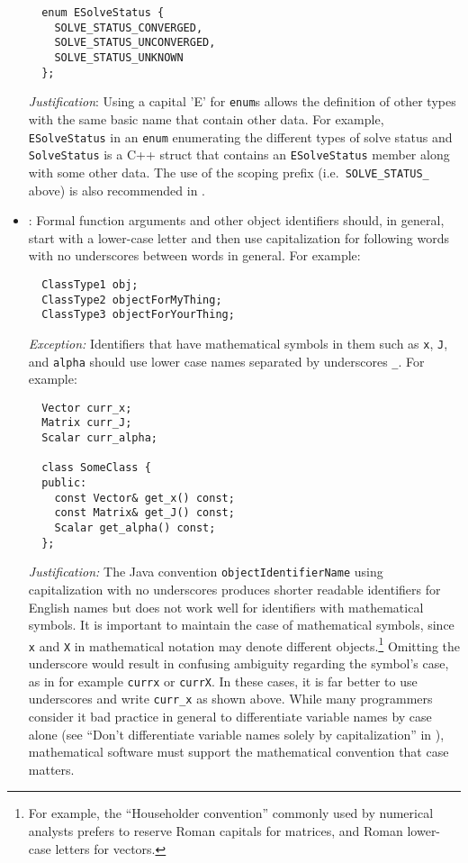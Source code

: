 \begin{itemize}
{\small\begin{verbatim}
  enum ESolveStatus {
    SOLVE_STATUS_CONVERGED,
    SOLVE_STATUS_UNCONVERGED,
    SOLVE_STATUS_UNKNOWN
  };
\end{verbatim}}


{}\textit{Justification}: Using a capital 'E' for {}\texttt{enum}s allows the
definition of other types with the same basic name that contain other data.
For example, {}\texttt{ESolveStatus} in an {}\texttt{enum} enumerating the
different types of solve status and {}\texttt{SolveStatus} is a C++ struct
that contains an {}\texttt{ESolveStatus} member along with some other data.
The use of the scoping prefix (i.e.\ {}\texttt{SOLVE\-\_STATUS\_} above) is
also recommended in {}\cite[Section 11.4]{CodeComplete2nd04}.


{}\item\NCObjectNames: Formal function arguments and other object identifiers
should, in general, start with a lower-case letter and then use capitalization
for following words with no underscores between words in general.  For
example:

{\small\begin{verbatim}
  ClassType1 obj;
  ClassType2 objectForMyThing;
  ClassType3 objectForYourThing;
\end{verbatim}}


{}\textit{Exception:} Identifiers that have mathematical symbols in
them such as {}\texttt{x}, {}\texttt{J}, and {}\texttt{alpha} should
use lower case names separated by underscores {}\texttt{\_}.  For
example:

{\small\begin{verbatim}
  Vector curr_x;
  Matrix curr_J;
  Scalar curr_alpha;

  class SomeClass {
  public:
    const Vector& get_x() const;
    const Matrix& get_J() const;
    Scalar get_alpha() const;
  };
\end{verbatim}}


\textit{Justification:} The Java convention
\texttt{objectIdentifierName} using capitalization with no underscores
produces shorter readable identifiers for English names but does not
work well for identifiers with mathematical symbols.  It is important
to maintain the case of mathematical symbols, since \texttt{x} and
\texttt{X} in mathematical notation may denote different
objects.\footnote{For example, the ``Householder convention'' commonly
  used by numerical analysts prefers to reserve Roman capitals for
  matrices, and Roman lower-case letters for vectors.}  Omitting the
underscore would result in confusing ambiguity regarding the symbol's
case, as in for example {}\texttt{currx} or {}\texttt{currX}.  In
these cases, it is far better to use underscores and write
\texttt{curr\_x} as shown above.  While many programmers consider it
bad practice in general to differentiate variable names by case alone
(see ``Don't differentiate variable names solely by capitalization''
in \cite[Section 11.7]{CodeComplete2nd04}), mathematical software must
support the mathematical convention that case matters.



\end{itemize}
